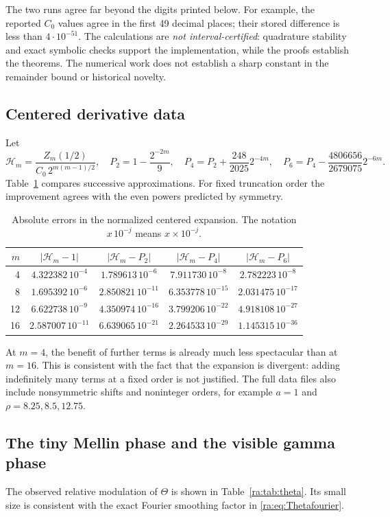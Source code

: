 \documentclass[11pt,a4paper,oneside,openany]{book}
\numberwithin{equation}{chapter}
\theoremstyle{definition}
\theoremstyle{remark}
\newcommand{\calH}{\mathcal H}
\begin{document}
The two runs agree far beyond the digits printed below. For example,
the reported $C_0$ values agree in the first 49 decimal places; their
stored difference is less than $4\cdot10^{-51}$.
The calculations are \emph{not interval-certified}: quadrature stability
and exact symbolic checks support the implementation, while the proofs
establish the theorems. The numerical work does not establish a sharp
constant in the remainder bound or historical novelty.

\subsection{Centered derivative data}
Let
\[
 \calH_m=\frac{Z_m(1/2)}{C_0\,2^{m(m-1)/2}},\quad
 P_2=1-\frac{2^{-2m}}9,\quad
 P_4=P_2+\frac{248}{2025}2^{-4m},\quad
 P_6=P_4-\frac{4806656}{2679075}2^{-6m}.
\]
Table~\ref{ra:tab:centered} compares successive approximations. For fixed
truncation order the improvement agrees with the even powers predicted by
symmetry.

\begin{table}[htbp]
\centering\small
\begin{tabular}{rcccc}
\toprule
$m$ & $|\calH_m-1|$ & $|\calH_m-P_2|$ & $|\calH_m-P_4|$ & $|\calH_m-P_6|$\\
\midrule
4  & $4.322382\,10^{-4}$ & $1.789613\,10^{-6}$ & $7.911730\,10^{-8}$ & $2.782223\,10^{-8}$\\
8  & $1.695392\,10^{-6}$ & $2.850821\,10^{-11}$& $6.353778\,10^{-15}$& $2.031475\,10^{-17}$\\
12 & $6.622738\,10^{-9}$ & $4.350974\,10^{-16}$& $3.799206\,10^{-22}$& $4.918108\,10^{-27}$\\
16 & $2.587007\,10^{-11}$& $6.639065\,10^{-21}$& $2.264533\,10^{-29}$& $1.145315\,10^{-36}$\\
\bottomrule
\end{tabular}
\caption{Absolute errors in the normalized centered expansion. The notation
$x\,10^{-j}$ means $x\times10^{-j}$.}
\label{ra:tab:centered}
\end{table}

At $m=4$, the benefit of further terms is already much less spectacular
than at $m=16$. This is consistent with the fact that the expansion is
divergent: adding indefinitely many terms at a fixed order is not justified.
The full data files also include nonsymmetric shifts and noninteger
orders, for example $a=1$ and $\rho=8.25,8.5,12.75$.

\subsection{The tiny Mellin phase and the visible gamma phase}
The observed relative modulation of $\Theta$ is shown in
Table~\ref{ra:tab:theta}. Its small size is consistent with the exact Fourier
smoothing factor in \eqref{ra:eq:Thetafourier}.
\end{document}
